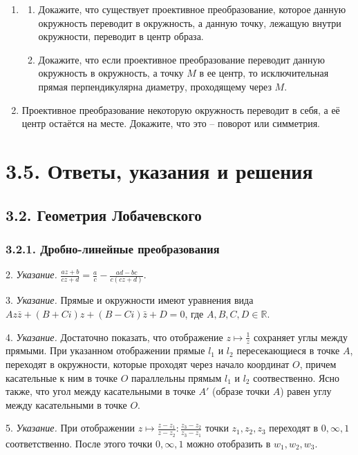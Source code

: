 \begin{enumerate}
		\item
		\begin{enumerate}
			\item Докажите, что существует проективное преобразование, которое данную окружность переводит в окружность, а данную точку, лежащую внутри окружности, переводит в центр образа.
			\item Докажите, что если проективное преобразование переводит данную окружность в окружность, а точку $M$ в ее центр, то исключительная прямая перпендикулярна диаметру, проходящему через $M$.
		\end{enumerate}
 
		\item Проективное преобразование некоторую окружность переводит в себя, а её центр остаётся на месте. Докажите, что это -- поворот или симметрия.
	\end{enumerate}
 
	\section{3.5. Ответы, указания и решения}
 
	\subsection{3.2. Геометрия Лобачевского}
 
	\subsubsection{3.2.1. Дробно-линейные преобразования}
 
	2. \textit{Указание.} $\frac{az+b}{cz+d} = \frac{a}{c} - \frac{ad-bc}{c(cz+d)}$.

	3. \textit{Указание.} Прямые и окружности имеют уравнения вида $A z\bar{z} + (B+Ci)z + (B-Ci)\bar{z} + D = 0$, где $A, B, C, D \in \mathbb{R}$.

	4. \textit{Указание.} Достаточно показать, что отображение $z \mapsto \frac{1}{z}$ сохраняет углы между прямыми. При указанном отображении прямые $l_1$ и $l_2$ пересекающиеся в точке $A$, переходят в окружности, которые проходят через начало координат $O$, причем касательные к ним в точке $O$ параллельны прямым $l_1$ и $l_2$ соотвественно. Ясно также, что угол между касательными в точке $A'$ (образе точки $A$) равен углу между касательными в точке $O$.

	5. \textit{Указание.} При отображении $z \mapsto \frac{z - z_1}{z - z_2} : \frac{z_3 - z_2}{z_3 - z_1}$ точки $z_1, z_2, z_3$ переходят в $0, \infty, 1$ соответственно. После этого точки $0, \infty, 1$ можно отобразить в $w_1, w_2, w_3$.

